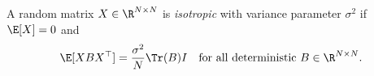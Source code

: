 \begin{definition}[Isotropy]\label{def:isotropy}
A random matrix $X \in \R^{N \times N}$ is \emph{isotropic} with variance parameter $\sigma^2$ if $\E[X] = 0$ and
\[
\E[XBX^\top] = \frac{\sigma^2}{N}\Tr(B) I \quad \text{for all deterministic } B \in \R^{N \times N}.
\]
\end{definition}
